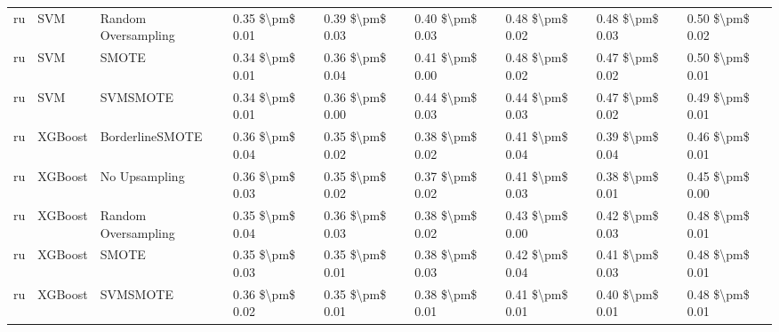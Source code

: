 \begin{tabular}{lllllllll}
      ru &                             SVM &           Random Oversampling & 0.35 \$\textbackslash pm\$ 0.01 &           0.39 \$\textbackslash pm\$ 0.03 &       0.40 \$\textbackslash pm\$ 0.03 &        0.48 \$\textbackslash pm\$ 0.02 &                         0.48 \$\textbackslash pm\$ 0.03 &     0.50 \$\textbackslash pm\$ 0.02 \\
      ru &                             SVM &                         SMOTE & 0.34 \$\textbackslash pm\$ 0.01 &           0.36 \$\textbackslash pm\$ 0.04 &       0.41 \$\textbackslash pm\$ 0.00 &        0.48 \$\textbackslash pm\$ 0.02 &                         0.47 \$\textbackslash pm\$ 0.02 &     0.50 \$\textbackslash pm\$ 0.01 \\
      ru &                             SVM &                      SVMSMOTE & 0.34 \$\textbackslash pm\$ 0.01 &           0.36 \$\textbackslash pm\$ 0.00 &       0.44 \$\textbackslash pm\$ 0.03 &        0.44 \$\textbackslash pm\$ 0.03 &                         0.47 \$\textbackslash pm\$ 0.02 &     0.49 \$\textbackslash pm\$ 0.01 \\
      ru &                         XGBoost &               BorderlineSMOTE & 0.36 \$\textbackslash pm\$ 0.04 &           0.35 \$\textbackslash pm\$ 0.02 &       0.38 \$\textbackslash pm\$ 0.02 &        0.41 \$\textbackslash pm\$ 0.04 &                         0.39 \$\textbackslash pm\$ 0.04 &     0.46 \$\textbackslash pm\$ 0.01 \\
      ru &                         XGBoost &                 No Upsampling & 0.36 \$\textbackslash pm\$ 0.03 &           0.35 \$\textbackslash pm\$ 0.02 &       0.37 \$\textbackslash pm\$ 0.02 &        0.41 \$\textbackslash pm\$ 0.03 &                         0.38 \$\textbackslash pm\$ 0.01 &     0.45 \$\textbackslash pm\$ 0.00 \\
      ru &                         XGBoost &           Random Oversampling & 0.35 \$\textbackslash pm\$ 0.04 &           0.36 \$\textbackslash pm\$ 0.03 &       0.38 \$\textbackslash pm\$ 0.02 &        0.43 \$\textbackslash pm\$ 0.00 &                         0.42 \$\textbackslash pm\$ 0.03 &     0.48 \$\textbackslash pm\$ 0.01 \\
      ru &                         XGBoost &                         SMOTE & 0.35 \$\textbackslash pm\$ 0.03 &           0.35 \$\textbackslash pm\$ 0.01 &       0.38 \$\textbackslash pm\$ 0.03 &        0.42 \$\textbackslash pm\$ 0.04 &                         0.41 \$\textbackslash pm\$ 0.03 &     0.48 \$\textbackslash pm\$ 0.01 \\
      ru &                         XGBoost &                      SVMSMOTE & 0.36 \$\textbackslash pm\$ 0.02 &           0.35 \$\textbackslash pm\$ 0.01 &       0.38 \$\textbackslash pm\$ 0.01 &        0.41 \$\textbackslash pm\$ 0.01 &                         0.40 \$\textbackslash pm\$ 0.01 &     0.48 \$\textbackslash pm\$ 0.01 \\
\bottomrule
\end{tabular}
